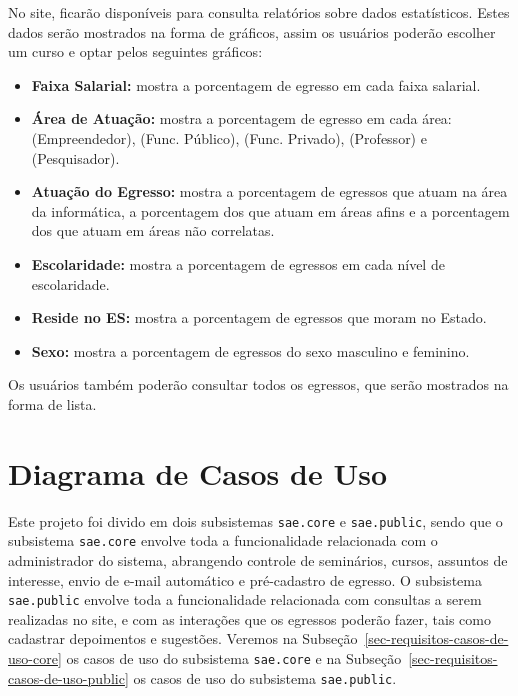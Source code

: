 No site, ficarão disponíveis para consulta relatórios sobre dados estatísticos. Estes dados serão mostrados na forma de gráficos, assim os usuários poderão escolher um curso e optar pelos seguintes gráficos: 

\begin{itemize}
	
  	\item \textbf{Faixa Salarial:} mostra a porcentagem de egresso em cada faixa salarial.
  	
  	\item \textbf{Área de Atuação:} mostra a porcentagem de egresso em cada área: (Empreendedor), (Func. Público), (Func. Privado), (Professor) e (Pesquisador).
  	
  	\item \textbf{Atuação do Egresso:} mostra a porcentagem de egressos que atuam na área da informática, a porcentagem dos que atuam em áreas afins e a porcentagem dos que atuam em áreas não correlatas. 
  	
  	\item \textbf{Escolaridade:} mostra a porcentagem de egressos em cada nível de escolaridade. 
  	
  	\item \textbf{Reside no ES:} mostra a porcentagem de egressos que moram no Estado.
  	
  	\item \textbf{Sexo:} mostra a porcentagem de egressos do sexo masculino e feminino.
  	  	
\end{itemize}

Os usuários também poderão consultar todos os egressos, que serão mostrados na forma de lista. 











\section{Diagrama de Casos de Uso}
\label{sec-requisitos-casos-de-uso}
	
Este projeto foi divido em dois subsistemas \texttt{sae.core} e \texttt{sae.public}, sendo que o subsistema \texttt{sae.core} envolve toda a funcionalidade relacionada com o administrador do sistema, abrangendo controle de seminários, cursos, assuntos de interesse, envio de e-mail automático e pré-cadastro de egresso. O subsistema \texttt{sae.public} envolve toda a funcionalidade relacionada com consultas a serem realizadas no site, e com as interações que os egressos poderão fazer, tais como cadastrar depoimentos e sugestões.
Veremos na Subseção~\ref{sec-requisitos-casos-de-uso-core} os casos de uso do subsistema \texttt{sae.core} e na Subseção~\ref{sec-requisitos-casos-de-uso-public} os casos de uso do subsistema \texttt{sae.public}.
	
